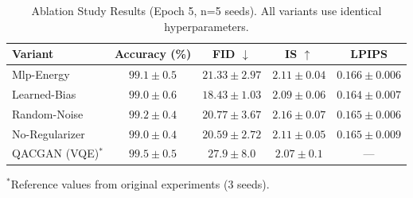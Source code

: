 
\begin{table}[h]
\centering
\caption{Ablation Study Results (Epoch 5, n=5 seeds). All variants use identical hyperparameters.}
\label{tab:ablation}
\begin{tabular}{lcccc}
\toprule
\textbf{Variant} & \textbf{Accuracy (\%)} & \textbf{FID} $\downarrow$ & \textbf{IS} $\uparrow$ & \textbf{LPIPS} \\
\midrule
Mlp-Energy & $99.1 \pm 0.5$ & $21.33 \pm 2.97$ & $2.11 \pm 0.04$ & $0.166 \pm 0.006$ \\
Learned-Bias & $99.0 \pm 0.6$ & $18.43 \pm 1.03$ & $2.09 \pm 0.06$ & $0.164 \pm 0.007$ \\
Random-Noise & $99.2 \pm 0.4$ & $20.77 \pm 3.67$ & $2.16 \pm 0.07$ & $0.165 \pm 0.006$ \\
No-Regularizer & $99.0 \pm 0.4$ & $20.59 \pm 2.72$ & $2.11 \pm 0.05$ & $0.165 \pm 0.009$ \\
\midrule
QACGAN (VQE)$^*$ & $99.5 \pm 0.5$ & $27.9 \pm 8.0$ & $2.07 \pm 0.1$ & --- \\
\bottomrule
\end{tabular}
\begin{tablenotes}
\small
\item $^*$Reference values from original experiments (3 seeds).
\end{tablenotes}
\end{table}
